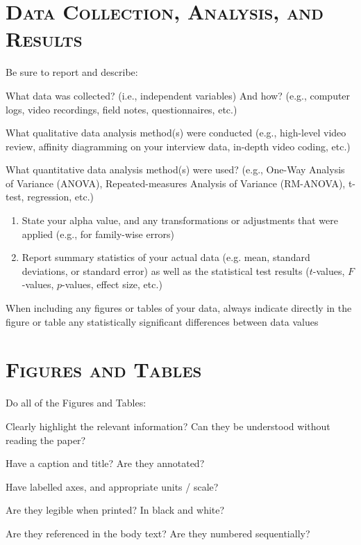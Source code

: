 \noindent\makebox[\linewidth]{\rule{\linewidth}{0.4pt}}
\section*{\textsc{Data Collection, Analysis, and Results}}

Be sure to report and describe: 
\begin{checklist}
	\item What data was collected? (i.e., independent variables) And how? (e.g., computer logs, video recordings, field notes, questionnaires, etc.) 

	\item What qualitative data analysis method(s) were conducted (e.g., high-level video review, affinity diagramming on your interview data, in-depth video coding, etc.)
	
	\item What quantitative data analysis method(s) were used? (e.g., One-Way Analysis of Variance (ANOVA), Repeated-measures Analysis of Variance (RM-ANOVA), t-test, regression, etc.) 	
	
	\begin{enumerate}
 		\item State your alpha value, and any transformations or adjustments that were applied (e.g., for family-wise errors)
		\item Report summary statistics of your actual data (e.g. mean, standard deviations, or standard error) as well as the statistical test results ($t$-values, $F$-values, $p$-values, effect size, etc.)
	\end{enumerate}
	\item When including any figures or tables of your data, always indicate directly in the figure or table any statistically significant differences between data values
\end{checklist}


\newpage
\section*{\textsc{Figures and Tables}}
\vspace{0.5cm}
Do all of the Figures and Tables:
\begin{checklist}
	\item Clearly highlight the relevant information? Can they be understood without reading the paper? 
	\item Have a caption and title? Are they annotated? 
	\item Have labelled axes, and appropriate units / scale?
	\item Are they legible when printed? In black and white?
	\item Are they referenced in the body text? Are they numbered sequentially?
\end{checklist}


